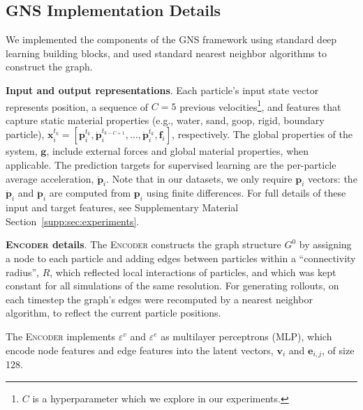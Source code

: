 \documentclass{article}
\newcommand{\xhdr}[1]{{\noindent\bfseries #1}.}
\newcommand{\encoder}{\textsc{Encoder}}
\begin{document}
\subsection{GNS Implementation Details}
\label{sec:experiment:architecture}

We implemented the components of the GNS framework using standard deep learning building blocks, and used standard nearest neighbor algorithms \cite{dong2011efficient,chen2009fast,tang2016visualizing} to construct the graph.

\xhdr{Input and output representations}
Each particle's input state vector represents position, a sequence of $C=5$ previous velocities\footnote{$C$ is a hyperparameter which we explore in our experiments.}, and features that capture static material properties (e.g., water, sand, goop, rigid, boundary particle), $\mathbf{x}^{t_k}_i = [\mathbf{p}^{t_k}_i, \dot{\mathbf{p}}^{t_{k-C+1}}_i, \dots, \dot{\mathbf{p}}^{t_k}_i, \mathbf{f}_i]$, respectively. 
%
The global properties of the system, $\mathbf{g}$, include external forces and global material properties, when applicable.
%
The prediction targets for supervised learning are the per-particle average acceleration, $\ddot{\mathbf{p}}_i$.
%
Note that in our datasets, we only require $\mathbf{p}_i$ vectors: the $\dot{\mathbf{p}}_i$ and $\ddot{\mathbf{p}}_i$ are computed from $\mathbf{p}_i$ using finite differences. For full details of these input and target features, see Supplementary Material Section~\ref{supp:sec:experiments}.

\xhdr{\encoder{} details} The \encoder{} constructs the graph structure $G^0$ by assigning a node to each particle and adding edges between particles within a ``connectivity radius'', $R$, which reflected local interactions of particles, and which was kept constant for all simulations of the same resolution. For generating rollouts, on each timestep the graph's edges were recomputed by a nearest neighbor algorithm, to reflect the current particle positions.

The \encoder{} implements $\varepsilon^v$ and $\varepsilon^e$ as multilayer perceptrons (MLP), which encode node features and edge features into the latent vectors, $\mathbf{v}_i$ and $\mathbf{e}_{i,j}$, of size 128.
\end{document}
